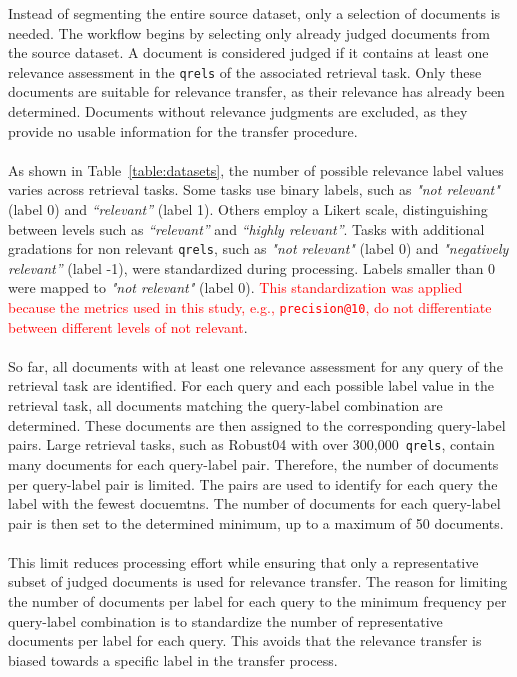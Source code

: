 Instead of segmenting the entire source dataset, only a selection of documents is needed. The workflow begins by selecting only already judged documents from the source dataset. A document is considered judged if it contains at least one relevance assessment in the \texttt{qrels} of the associated retrieval task. Only these documents are suitable for relevance transfer, as their relevance has already been determined. Documents without relevance judgments are excluded, as they provide no usable information for the transfer procedure.
\\\\
As shown in Table~\ref{table:datasets}, the number of possible relevance label values varies across retrieval tasks. Some tasks use binary labels, such as \textit{"not relevant"} (label 0) and \textit{“relevant”} (label 1). Others employ a Likert scale, distinguishing between levels such as \textit{“relevant”} and \textit{“highly relevant”}. Tasks with additional gradations for non relevant \texttt{qrels}, such as \textit{"not relevant"} (label 0) and \textit{"negatively relevant”} (label -1), were standardized during processing. Labels smaller than 0 were mapped to \textit{"not relevant"} (label 0). \textcolor{red}{This standardization was applied because the metrics used in this study, e.g., \texttt{precision@10}, do not differentiate between different levels of not relevant}.
\\\\
So far, all documents with at least one relevance assessment for any query of the retrieval task are identified. For each query and each possible label value in the retrieval task, all documents matching the query-label combination are determined. These documents are then assigned to the corresponding query-label pairs. Large retrieval tasks, such as Robust04 with over 300,000~\texttt{qrels}, contain many documents for each query-label pair. Therefore, the number of documents per query-label pair is limited. The pairs are used to identify for each query the label with the fewest docuemtns. The number of documents for each query-label pair is then set to the determined minimum, up to a maximum of 50 documents. 
\\\\
This limit reduces processing effort while ensuring that only a representative subset of judged documents is used for relevance transfer. The reason for limiting the number of documents per label for each query to the minimum frequency per query-label combination is to standardize the number of representative documents per label for each query. This avoids that the relevance transfer is biased towards a specific label in the transfer process.

